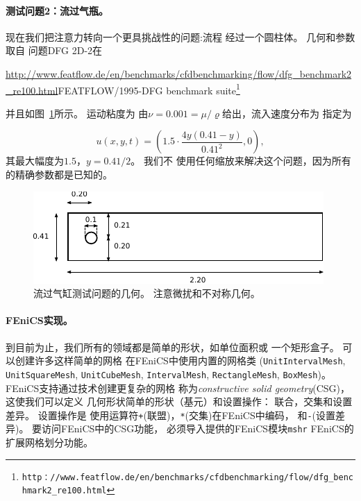 \paragraph{测试问题2：流过气瓶。}

现在我们把注意力转向一个更具挑战性的问题:流程
经过一个圆柱体。 几何和参数取自
问题DFG 2D-2在
\begin{center}
\url{http://www.featflow.de/en/benchmarks/cfdbenchmarking/flow/dfg_benchmark2_re100.html}{FEATFLOW/1995-DFG benchmark suite}\footnote{\texttt{http：//www.featflow.de/en/benchmarks/cfdbenchmarking/flow/dfg\_benchmark2\_re100.html}}
\end{center}
并且如图~\ref{ftut1:navier_stokes_cylinder:geometry}所示。 运动粘度为
由$\nu = 0.001 = \mu/\varrho$给出，流入速度分布为
指定为

\[
  u(x, y, t) = \left(1.5 \cdot \frac{4y(0.41 - y)}{0.41^2}, 0\right),
\]
其最大幅度为$1.5$，$y = 0.41/2$。 我们不
使用任何缩放来解决这个问题，因为所有的精确参数都是已知的。

\begin{figure}[!ht]  %
 \centerline{\includegraphics[width=0.95\linewidth]{fig/navier_stokes_cylinder_geometry.pdf}}
 \caption{
 流过气缸测试问题的几何。 注意微扰和不对称几何。\label{ftut1:navier_stokes_cylinder:geometry}
 }
\end{figure}

\paragraph{FEniCS实现。}
到目前为止，我们所有的领域都是简单的形状，如单位面积或
一个矩形盒子。 可以创建许多这样简单的网格
在FEniCS中使用内置的网格类
(\texttt{UnitIntervalMesh},
\texttt{UnitSquareMesh},
\texttt{UnitCubeMesh},
\texttt{IntervalMesh},
\texttt{RectangleMesh},
\texttt{BoxMesh})。
FEniCS支持通过技术创建更复杂的网格
称为\emph{constructive solid geometry}(CSG)，这使我们可以定义
几何形状简单的形状（基元）和设置操作：
联合，交集和设置差异。 设置操作是
使用运算符\texttt{+}(联盟)，\texttt{*}(交集)在FEniCS中编码，
和\texttt{-}(设置差异)。 要访问FEniCS中的CSG功能，
必须导入提供的FEniCS模块\texttt{mshr}
FEniCS的扩展网格划分功能。

